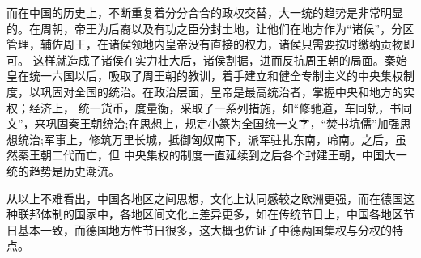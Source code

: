 而在中国的历史上，不断重复着分分合合的政权交替，大一统的趋势是非常明显的。在周朝，帝王为后裔以及有功之臣分封土地，让他们在地方作为“诸侯”，分区管理，辅佐周王，在诸侯领地内皇帝没有直接的权力，诸侯只需要按时缴纳贡物即可。
这样就造成了诸侯在实力壮大后，诸侯割据，进而反抗周王朝的局面。秦始皇在统一六国以后，吸取了周王朝的教训，着手建立和健全专制主义的中央集权制度，以巩固对全国的统治。在政治层面，皇帝是最高统治者，掌握中央和地方的实权；经济上，
统一货币，度量衡，采取了一系列措施，如“修驰道，车同轨，书同文”，来巩固秦王朝统治;在思想上，规定小篆为全国统一文字，“焚书坑儒”加强思想统治;军事上，修筑万里长城，抵御匈奴南下，派军驻扎东南，岭南。之后，虽然秦王朝二代而亡，但
中央集权的制度一直延续到之后各个封建王朝，中国大一统的趋势是历史潮流。

从以上不难看出，中国各地区之间思想，文化上认同感较之欧洲更强，而在德国这种联邦体制的国家中，各地区间文化上差异更多，如在传统节日上，中国各地区节日基本一致，而德国地方性节日很多，这大概也佐证了中德两国集权与分权的特点。



